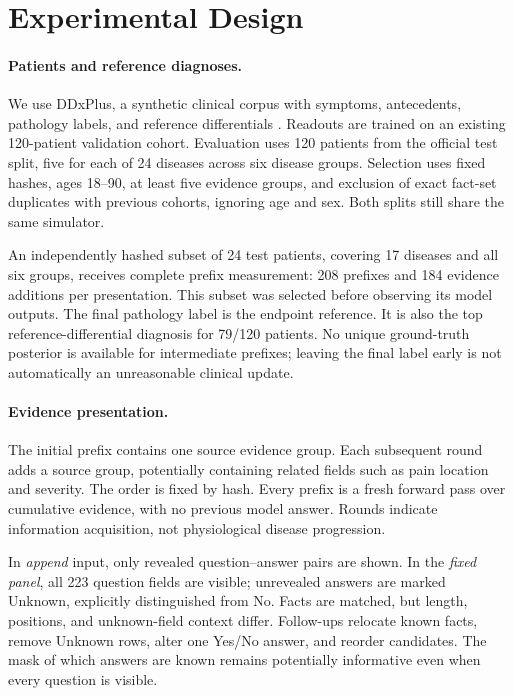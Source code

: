 \documentclass[11pt]{article}
\begin{document}
\section{Experimental Design}
\label{sec:design}
\paragraph{Patients and reference diagnoses.}
We use DDxPlus, a synthetic clinical corpus with symptoms, antecedents, pathology labels, and reference differentials \citep{ddxplus}. Readouts are trained on an existing 120-patient validation cohort. Evaluation uses 120 patients from the official test split, five for each of 24 diseases across six disease groups. Selection uses fixed hashes, ages 18--90, at least five evidence groups, and exclusion of exact fact-set duplicates with previous cohorts, ignoring age and sex. Both splits still share the same simulator.

An independently hashed subset of 24 test patients, covering 17 diseases and all six groups, receives complete prefix measurement: 208 prefixes and 184 evidence additions per presentation. This subset was selected before observing its model outputs. The final pathology label is the endpoint reference. It is also the top reference-differential diagnosis for 79/120 patients. No unique ground-truth posterior is available for intermediate prefixes; leaving the final label early is not automatically an unreasonable clinical update.

\paragraph{Evidence presentation.}
The initial prefix contains one source evidence group. Each subsequent round adds a source group, potentially containing related fields such as pain location and severity. The order is fixed by hash. Every prefix is a fresh forward pass over cumulative evidence, with no previous model answer. Rounds indicate information acquisition, not physiological disease progression.

In \emph{append} input, only revealed question--answer pairs are shown. In the \emph{fixed panel}, all 223 question fields are visible; unrevealed answers are marked Unknown, explicitly distinguished from No. Facts are matched, but length, positions, and unknown-field context differ. Follow-ups relocate known facts, remove Unknown rows, alter one Yes/No answer, and reorder candidates. The mask of which answers are known remains potentially informative even when every question is visible.
\end{document}
